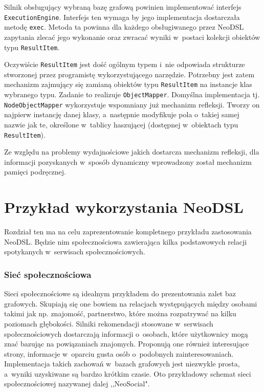 \documentclass[brudnopis]{xmgr}
\begin{document}
Silnik obsługujący wybraną bazę grafową powinien implementować interfejs \texttt{ExecutionEngine}. Interfejs ten wymaga by jego implementacja dostarczała metodę \texttt{exec}. Metoda ta powinna dla każdego obsługiwanego przez NeoDSL zapytania zlecać jego wykonanie oraz zwracać wyniki w~postaci kolekcji obiektów typu \texttt{ResultItem}.

Oczywiście \texttt{ResultItem} jest dość ogólnym typem i~nie odpowiada strukturze stworzonej przez programistę wykorzystującego narzędzie. Potrzebny jest zatem mechanizm zajmujący się zamianą obiektów typu \texttt{ResultItem} na instancje klas wybranego typu. Zadanie to realizuje \texttt{ObjectMapper}. Domyślna implementacja tj. \texttt{NodeObjectMapper} wykorzystuje wspomniany już mechanizm refleksji. Tworzy on najpierw instancję danej klasy, a~następnie modyfikuje pola o~takiej samej nazwie jak te, określone w~tablicy haszującej (dostępnej w~obiektach typu \texttt{ResultItem}).

Ze względu na problemy wydajnościowe jakich dostarcza mechanizm refleksji, dla informacji pozyskanych w~sposób dynamiczny wprowadzony został mechanizm pamięci podręcznej.

\chapter{Przykład wykorzystania NeoDSL}

Rozdział ten ma na celu zaprezentowanie kompletnego przykładu zastosowania NeoDSL. Będzie nim społecznościowa zawierająca kilka podstawowych relacji spotykanych w~serwisach społecznościowych.

\subsection{Sieć społecznościowa}

Sieci społecznościowe są idealnym przykładem do prezentowania zalet baz grafowych. Skupiają się one bowiem na relacjach występujących między osobami takimi jak np. znajomość, partnerstwo, które można rozpatrywać na kilku poziomach głębokości. Silniki rekomendacji stosowane w~serwisach społecznościowych dostarczają informacji o~osobach, które użytkownicy mogą znać bazując na powiązaniach znajomych. Proponują one również interesujące strony, informacje w~oparciu gusta osób o~podobnych zainteresowaniach. Implementacja takich zachowań w~bazach grafowych jest niezwykle prosta, a~wyniki uzyskiwane są bardzo krótkim czasie. Oto przykładowy schemat sieci społecznościowej nazywanej dalej ,,NeoSocial".
\end{document}
